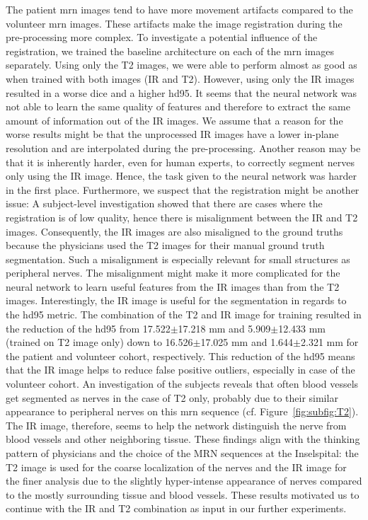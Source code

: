 The patient \gls{mrn} images tend to have more movement artifacts compared to the volunteer \gls{mrn} images. These artifacts make the image registration during the pre-processing more complex. To investigate a potential influence of the registration, we trained the baseline architecture on each of the \gls{mrn} images separately. Using only the T2 images, we were able to perform almost as good as when trained with both images (IR and T2). However, using only the IR images resulted in a worse \acrlong{dice} and a higher \acrlong{hd95}. It seems that the neural network was not able to learn the same quality of features and therefore to extract the same amount of information out of the IR images. We assume that a reason for the worse results might be that the unprocessed IR images have a lower in-plane resolution and are interpolated during the pre-processing. Another reason may be that it is inherently harder, even for human experts, to correctly segment nerves only using the IR image. Hence, the task given to the neural network was harder in the first place. Furthermore, we suspect that the registration might be another issue: A subject-level investigation showed that there are cases where the registration is of low quality, hence there is misalignment between the IR and T2 images. Consequently, the IR images are also misaligned to the ground truths because the physicians used the T2 images for their manual ground truth segmentation. Such a misalignment is especially relevant for small structures as peripheral nerves. The misalignment might make it more complicated for the neural network to learn useful features from the IR images than from the T2 images. Interestingly, the IR image is useful for the segmentation in regards to the \gls{hd95} metric. The combination of the T2 and IR image for training resulted in the reduction of the \acrlong{hd95} from 17.522$\pm$17.218 mm and 5.909$\pm$12.433 mm (trained on T2 image only) down to 16.526$\pm$17.025 mm and 1.644$\pm$2.321 mm for the patient and volunteer cohort, respectively. This reduction of the \gls{hd95} means that the IR image helps to reduce false positive outliers, especially in case of the volunteer cohort. An investigation of the subjects reveals that often blood vessels get segmented as nerves in the case of T2 only, probably due to their similar appearance to peripheral nerves on this \gls{mrn} sequence (cf. Figure~\ref{fig:subfig:T2}). The IR image, therefore, seems to help the network distinguish the nerve from blood vessels and other neighboring tissue. These findings align with the thinking pattern of physicians and the choice of the MRN sequences at the Inselspital: the T2 image is used for the coarse localization of the nerves and the IR image for the finer analysis due to the slightly hyper-intense appearance of nerves compared to the mostly surrounding tissue and blood vessels. These results motivated us to continue with the IR and T2 combination as input in our further experiments.

